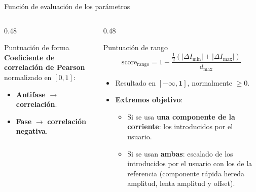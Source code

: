 \documentclass[10pt, aspectratio=169]{beamer}
\begin{document}
\begin{frame}{Función de evaluación de los parámetros}
    \centering
    \begin{columns}[t]
        \begin{column}{0.48\textwidth}
            \begin{block}{Puntuación de forma}
                \small
                \textbf{Coeficiente de correlación de Pearson} normalizado en $[0, 1]$:
                \begin{itemize}
                    \item \textbf{Antifase} $\to$ \textbf{correlación}.
                    \item \textbf{Fase} $\to$ \textbf{correlación negativa}.
                \end{itemize}
            \end{block}
        \end{column}
        \begin{column}{0.48\textwidth}
            \begin{block}{Puntuación de rango}
                \scriptsize
                \begin{equation*}
                    \mathrm{score}_{\mathrm{rango}} = 1 - \frac{\frac{1}{2}(|\Delta I_{\min}| + |\Delta I_{\max}|)}{d_{\max}}
                \end{equation*}
                \begin{itemize}
                    \item Resultado en $\boldsymbol{[-\infty, 1]}$, normalmente $\ge 0$.
                    \item \textbf{Extremos objetivo}:
                          \begin{itemize}
                              \scriptsize
                              \item Si se usa \textbf{una componente de la corriente}: los introducidos por el usuario.
                              \item Si se usan \textbf{ambas}: escalado de los introducidos por el usuario con los de la referencia (componente rápida hereda amplitud, lenta amplitud y offset).
                          \end{itemize}
                \end{itemize}
            \end{block}
        \end{column}
    \end{columns}
    \vspace{0.8em}
    \par
\end{frame}
\end{document}
